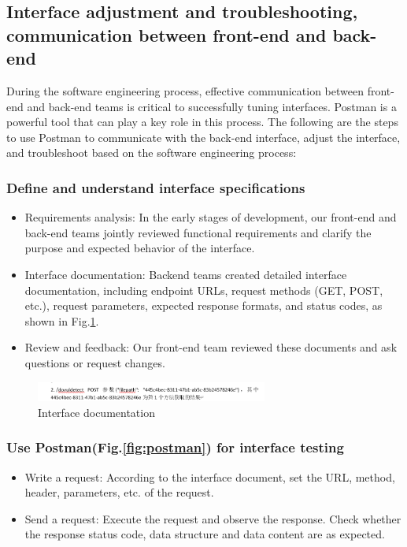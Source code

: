 \documentclass[journal]{IEEEtran}
\begin{document}
\subsection{Interface adjustment and troubleshooting, communication between front-end and back-end}
During the software engineering process, effective communication between front-end and back-end teams is critical to successfully tuning interfaces. Postman is a powerful tool that can play a key role in this process. The following are the steps to use Postman to communicate with the back-end interface, adjust the interface, and troubleshoot based on the software engineering process:
\subsubsection{Define and understand interface specifications}
\begin{itemize}
  \item Requirements analysis: In the early stages of development, our front-end and back-end teams jointly reviewed functional requirements and clarify the purpose and expected behavior of the interface.
  \item Interface documentation: Backend teams created detailed interface documentation, including endpoint URLs, request methods (GET, POST, etc.), request parameters, expected response formats, and status codes, as shown in Fig.\ref{fig:interfacespec}.
  \item Review and feedback: Our front-end team reviewed these documents and ask questions or request changes.
\end{itemize}

\begin{figure}[h]
  \centering
  \includegraphics[width=3in]{figures/solution-interspec.png}
  \caption{Interface documentation}
  \label{fig:interfacespec}
  \end{figure}

\subsubsection{Use Postman(Fig.\ref{fig:postman}) for interface testing}
\begin{itemize}
  \item Write a request: According to the interface document, set the URL, method, header, parameters, etc. of the request.
  \item Send a request: Execute the request and observe the response. Check whether the response status code, data structure and data content are as expected.
\end{itemize}
\end{document}
